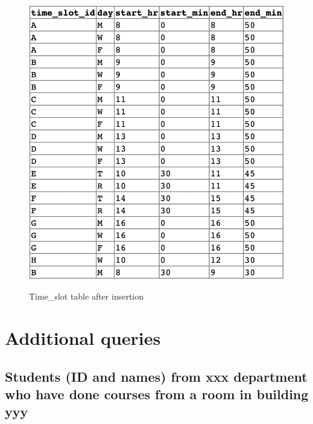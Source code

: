\documentclass[12pt]{article}
\begin{document}
\begin{figure}[!hbt]
    \centering
    \includegraphics[scale=0.85]{screenshots/time_slot.png}
    \label{fig:my_label1}
    \caption{Time\_slot table after insertion}
\end{figure}
\newpage


\section{Additional queries}

\subsection{Students (ID and names) from xxx department who have done courses from a room in building yyy}
\end{document}
